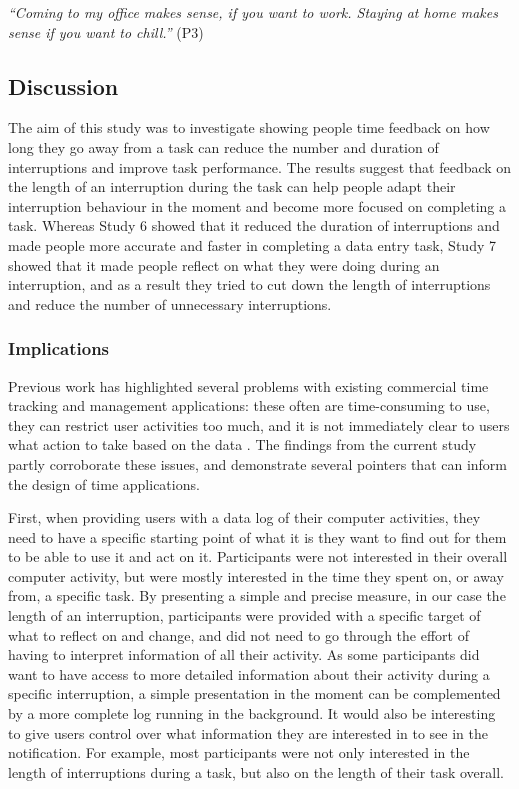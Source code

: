 \textit{“Coming to my office makes sense, if you want to work. Staying at home makes sense if you want to chill.”} (P3)

\subsection{Discussion}
The aim of this study was to investigate showing people time feedback on how long they go away from a task can reduce the number and duration of interruptions and improve task performance. The results suggest that feedback on the length of an interruption during the task can help people adapt their interruption behaviour in the moment and become more focused on completing a task. Whereas Study 6 showed that it reduced the duration of interruptions and made people more accurate and faster in completing a data entry task, Study 7 showed that it made people reflect on what they were doing during an interruption, and as a result they tried to cut down the length of interruptions and reduce the number of unnecessary interruptions.

\subsubsection{Implications}
Previous work has highlighted several problems with existing commercial time tracking and management applications: these often are time-consuming to use, they can restrict user activities too much, and it is not immediately clear to users what action to take based on the data \citep{Collins2014, Whittaker2016}. The findings from the current study partly corroborate these issues, and demonstrate several pointers that can inform the design of time applications. 

First, when providing users with a data log of their computer activities, they need to have a specific starting point of what it is they want to find out for them to be able to use it and act on it. Participants were not interested in their overall computer activity, but were mostly interested in the time they spent on, or away from, a specific task. By presenting a simple and precise measure, in our case the length of an interruption, participants were provided with a specific target of what to reflect on and change, and did not need to go through the effort of having to interpret information of all their activity. As some participants did want to have access to more detailed information about their activity during a specific interruption, a simple presentation in the moment can be complemented by a more complete log running in the background. It would also be interesting to give users control over what information they are interested in to see in the notification. For example, most participants were not only interested in the length of interruptions during a task, but also on the length of their task overall. 

